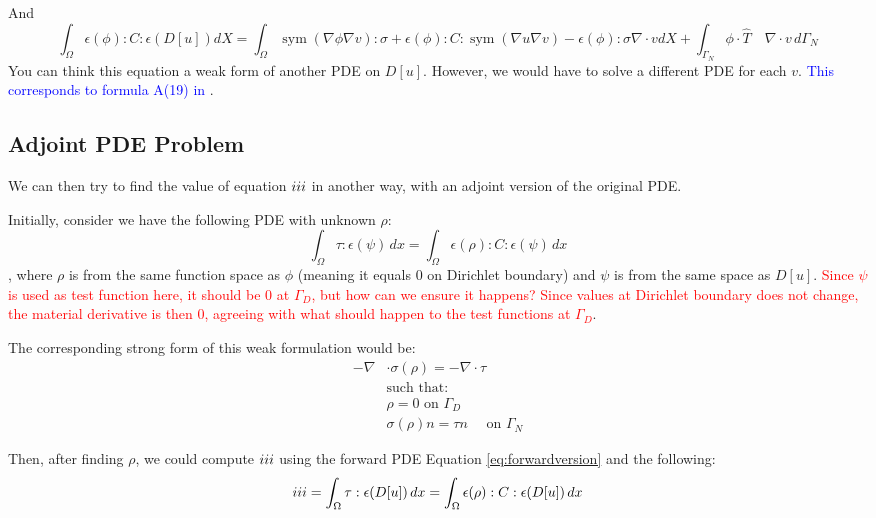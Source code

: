 \documentclass[11pt]{article}
\DeclareMathOperator{\sym}{sym}
\newcommand{\RNum}[1]{\uppercase\expandafter{\romannumeral #1\relax}}
\newcommand{\blue}{\textcolor{blue}}
\begin{document}
And
{\small
\begin{equation}
  \boxed{\int_{\Omega} \epsilon(\phi):C:\epsilon(D[u]) dX =
  \int_{\Omega} \sym(\nabla \phi \nabla v):\sigma + \epsilon(\phi):C:\sym(\nabla u \nabla v) - \epsilon(\phi): \sigma \nabla \cdot v  dX + \int_{\Gamma_{N}} \phi \cdot \hat T \quad \nabla \cdot v\, d\Gamma_{N}}
  \label{eq:forwardversion}
\end{equation}
}
You can think this equation a weak form of another PDE on $D[u]$. However, we would have to solve a different PDE for each $v$. \blue{This corresponds to formula A(19) in \cite{panetta2017}}.

\subsection{Adjoint PDE Problem}
We can then try to find the value of equation $\RNum{3}$ in another way, with an adjoint version of the original PDE.

Initially, consider we have the following PDE with unknown $\rho$:
\begin{equation}
  \int_\Omega \tau:\epsilon(\psi)\, dx = \int_\Omega \epsilon(\rho):C:\epsilon(\psi) \, dx 
  \label{eq:adjointproblem}
\end{equation}
, where $\rho$ is from the same function space as $\phi$ (meaning it equals $0$ on Dirichlet boundary) and $\psi$ is from the same space as $D[u]$. \textcolor{red}{Since $\psi$ is used as test function here, it should be $0$ at $\Gamma_D$, but how can we ensure it happens? Since values at Dirichlet boundary does not change, the material derivative is then $0$, agreeing with what should happen to the test functions at $\Gamma_D$}.

The corresponding strong form of this weak formulation would be:
\begin{align*}
  - \nabla & \cdot \sigma(\rho) = - \nabla \cdot \tau \\
  &\text{such that: } \\
  &\rho =  0 \text{ on $\Gamma_D$}\\
  &\sigma(\rho) n = \tau n \quad \text{ on $\Gamma_N$}
\end{align*}


Then, after finding $\rho$, we could compute $\RNum{3}$ using the forward PDE Equation \ref{eq:forwardversion} and the following:
\begin{align*}
  \RNum{3} = \int_\Omega \tau:\epsilon(D[u])\, dx = \int_\Omega \epsilon(\rho):C:\epsilon(D[u]) \, dx
\end{align*}
\end{document}
